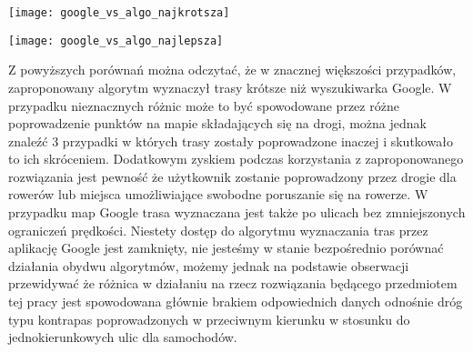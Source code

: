 \begin{center}
\texttt{[image: google\_vs\_algo\_najkrotsza]}
\end{center}

\begin{center}
\texttt{[image: google\_vs\_algo\_najlepsza]}
\end{center}

Z powyższych porównań można odczytać, że w znacznej większości przypadków, zaproponowany algorytm wyznaczył trasy krótsze niż wyszukiwarka Google. W przypadku nieznacznych różnic może to być spowodowane przez różne poprowadzenie punktów na mapie składających się na drogi, można jednak znaleźć 3 przypadki w których trasy zostały poprowadzone inaczej i skutkowało to ich skróceniem. Dodatkowym zyskiem podczas korzystania z zaproponowanego rozwiązania jest pewność że użytkownik zostanie poprowadzony przez drogie dla rowerów lub miejsca umożliwiające swobodne poruszanie się na rowerze. W przypadku map Google trasa wyznaczana jest także po ulicach bez zmniejszonych ograniczeń prędkości. Niestety dostęp do algorytmu wyznaczania tras przez aplikację Google jest zamknięty, nie jesteśmy w stanie bezpośrednio porównać działania obydwu algorytmów, możemy jednak na podstawie obserwacji przewidywać że różnica w działaniu na rzecz rozwiązania będącego przedmiotem tej pracy jest spowodowana głównie brakiem odpowiednich danych odnośnie dróg typu kontrapas poprowadzonych w przeciwnym kierunku w stosunku do jednokierunkowych ulic dla samochodów.